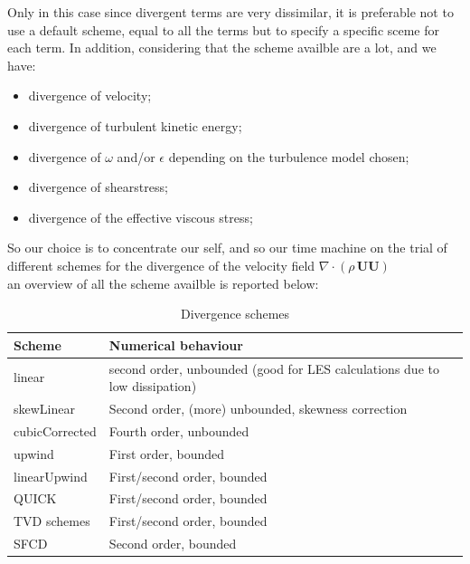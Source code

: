 \documentclass[a4paper,12pt]{article}
\begin{document}
Only in this case since divergent terms are very dissimilar, it is preferable not to use a default scheme, equal to all the terms but to specify a specific sceme for each term. In addition, considering that the scheme availble are a lot, and we have:
\begin{itemize} 
 \item divergence of velocity;
 \item divergence of turbulent kinetic energy;
 \item divergence of $\omega$ and/or $\epsilon$ depending on the turbulence model chosen;
 \item divergence of shearstress;
  \item divergence of the effective viscous stress; %
\end{itemize} 
So our choice is to concentrate our self, and so our time machine on the trial of different schemes for the divergence of the velocity field
 $ \nabla \cdot ( \rho \, \bm{U} \bm{U} )$
\\ an overview of all the scheme availble is reported below:


\begin{table}[H]
\centering
\begin{tabular}{ll}
\toprule
Scheme         & Numerical behaviour                                                               \\ \midrule
linear         & second order, unbounded (good for LES calculations due to low dissipation) \\
skewLinear     & Second order, (more) unbounded, skewness correction                               \\
cubicCorrected & Fourth order, unbounded                                                           \\
upwind         & First order, bounded                                                              \\
linearUpwind   & First/second order, bounded                                                       \\
QUICK          & First/second order, bounded                                                       \\
TVD schemes    & First/second order, bounded                                                       \\
SFCD           & Second order, bounded                                                             \\ \bottomrule
\end{tabular}
\caption{Divergence schemes}
\label{table:divergence}
\end{table}
\end{document}
